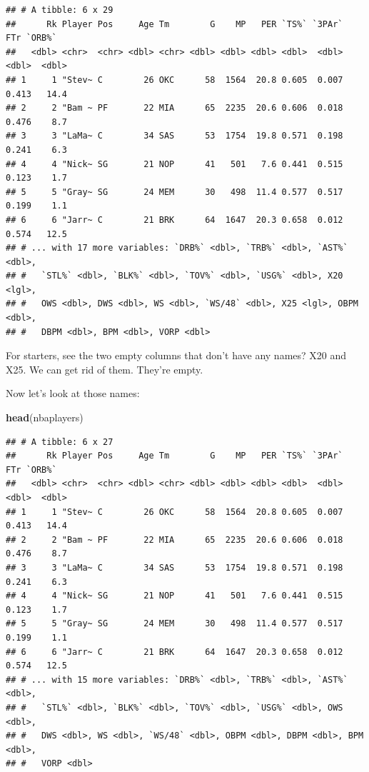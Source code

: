 \documentclass[
]{book}
\newenvironment{Shaded}{\begin{snugshade}}{\end{snugshade}}
\newcommand{\KeywordTok}[1]{\textcolor[rgb]{0.13,0.29,0.53}{\textbf{#1}}}
\newcommand{\NormalTok}[1]{#1}
\newcommand{\OperatorTok}[1]{\textcolor[rgb]{0.81,0.36,0.00}{\textbf{#1}}}
\newcommand{\StringTok}[1]{\textcolor[rgb]{0.31,0.60,0.02}{#1}}
\begin{document}
\begin{verbatim}
## # A tibble: 6 x 29
##      Rk Player Pos     Age Tm        G    MP   PER `TS%` `3PAr`   FTr `ORB%`
##   <dbl> <chr>  <chr> <dbl> <chr> <dbl> <dbl> <dbl> <dbl>  <dbl> <dbl>  <dbl>
## 1     1 "Stev~ C        26 OKC      58  1564  20.8 0.605  0.007 0.413   14.4
## 2     2 "Bam ~ PF       22 MIA      65  2235  20.6 0.606  0.018 0.476    8.7
## 3     3 "LaMa~ C        34 SAS      53  1754  19.8 0.571  0.198 0.241    6.3
## 4     4 "Nick~ SG       21 NOP      41   501   7.6 0.441  0.515 0.123    1.7
## 5     5 "Gray~ SG       24 MEM      30   498  11.4 0.577  0.517 0.199    1.1
## 6     6 "Jarr~ C        21 BRK      64  1647  20.3 0.658  0.012 0.574   12.5
## # ... with 17 more variables: `DRB%` <dbl>, `TRB%` <dbl>, `AST%` <dbl>,
## #   `STL%` <dbl>, `BLK%` <dbl>, `TOV%` <dbl>, `USG%` <dbl>, X20 <lgl>,
## #   OWS <dbl>, DWS <dbl>, WS <dbl>, `WS/48` <dbl>, X25 <lgl>, OBPM <dbl>,
## #   DBPM <dbl>, BPM <dbl>, VORP <dbl>
\end{verbatim}

For starters, see the two empty columns that don't have any names? X20 and X25. We can get rid of them. They're empty.

\begin{Shaded}
\end{Shaded}

Now let's look at those names:

\begin{Shaded}
\begin{Highlighting}[]
\KeywordTok{head}\NormalTok{(nbaplayers)}
\end{Highlighting}
\end{Shaded}

\begin{verbatim}
## # A tibble: 6 x 27
##      Rk Player Pos     Age Tm        G    MP   PER `TS%` `3PAr`   FTr `ORB%`
##   <dbl> <chr>  <chr> <dbl> <chr> <dbl> <dbl> <dbl> <dbl>  <dbl> <dbl>  <dbl>
## 1     1 "Stev~ C        26 OKC      58  1564  20.8 0.605  0.007 0.413   14.4
## 2     2 "Bam ~ PF       22 MIA      65  2235  20.6 0.606  0.018 0.476    8.7
## 3     3 "LaMa~ C        34 SAS      53  1754  19.8 0.571  0.198 0.241    6.3
## 4     4 "Nick~ SG       21 NOP      41   501   7.6 0.441  0.515 0.123    1.7
## 5     5 "Gray~ SG       24 MEM      30   498  11.4 0.577  0.517 0.199    1.1
## 6     6 "Jarr~ C        21 BRK      64  1647  20.3 0.658  0.012 0.574   12.5
## # ... with 15 more variables: `DRB%` <dbl>, `TRB%` <dbl>, `AST%` <dbl>,
## #   `STL%` <dbl>, `BLK%` <dbl>, `TOV%` <dbl>, `USG%` <dbl>, OWS <dbl>,
## #   DWS <dbl>, WS <dbl>, `WS/48` <dbl>, OBPM <dbl>, DBPM <dbl>, BPM <dbl>,
## #   VORP <dbl>
\end{verbatim}
\end{document}
